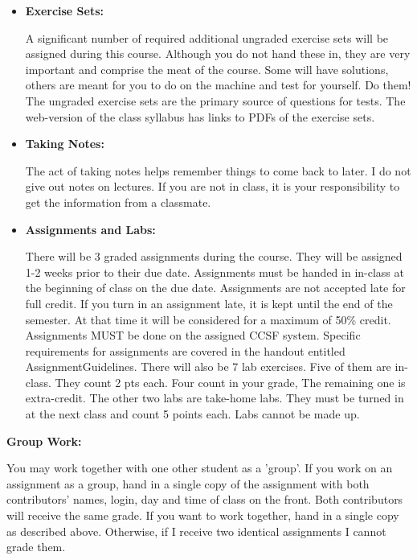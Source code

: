 \documentclass[11pt]{article}
\begin{document}
\begin{itemize}
	\item \textbf {Exercise Sets:}

A significant number of required additional ungraded exercise sets will be
assigned during this course. Although you do not hand these in, they are very
important and comprise the meat of the course. Some will have solutions, others
are meant for you to do on the machine and test for yourself. Do them! The
ungraded exercise sets are the primary source of questions for tests. The
web-version of the class syllabus has links to PDFs of the exercise sets.

	\item \textbf {Taking Notes:}

The act of taking notes helps remember things to come back to later. I do not give out notes on lectures. If you are not in class, it is your responsibility to get the information from a classmate.

        \item \textbf {Assignments and Labs:}

There will be 3 graded assignments during the course. They will be assigned 1-2
weeks prior to their due date.  Assignments must be handed in in-class at the
beginning of class on the due date. Assignments are not accepted late for full
credit. If you turn in an assignment late, it is kept until the end of the
semester. At that time it will be considered for a maximum of 50\% credit.
Assignments MUST be done on the assigned CCSF system.  Specific requirements
for assignments are covered in the handout entitled AssignmentGuidelines.
There will also be 7 lab exercises. Five of them are in-class. They count 2 pts
each. Four count in your grade, The remaining one is extra-credit. The other
two labs are take-home labs. They must be turned in at the next class and count
5 points each. Labs cannot be made up.

\end{itemize}

\textbf {Group Work:}

\hspace{3mm}

You may work together with one other student as a 'group'. If you work on an
assignment as a group, hand in a single copy of the assignment with both
contributors' names, login, day and time of class on the front. Both
contributors will receive the same grade. If you want to work together, hand in
a single copy as described above. Otherwise, if I receive two identical
assignments I cannot grade them. 
\end{document}
